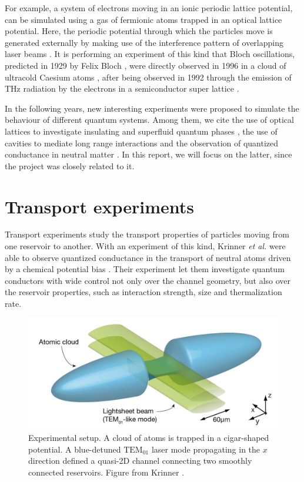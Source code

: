 For example, a system of electrons moving in an ionic periodic lattice potential, can be simulated using a gas of fermionic atoms trapped in an optical lattice potential. Here, the periodic potential
through which the particles move is generated externally by making
use of the interference pattern of overlapping laser beams \cite{bloch2008}. It is performing an experiment of this kind that Bloch oscillations, predicted in 1929 by Felix Bloch \cite{bloch1929a}, were directly observed in 1996 in a cloud of ultracold Caesium atoms \cite{dahan1996}, after being observed in 1992 through the emission of THz radiation by the electrons in a semiconductor super lattice \cite{feldmann1992}.

In the following years, new interesting experiments were proposed to simulate the behaviour of different quantum systems. Among them, we cite the use of optical lattices to investigate insulating and superfluid quantum phases \cite{greiner2002}, the use of cavities to mediate long range interactions \cite{landig2016} and the observation of quantized conductance in neutral matter \cite{krinner2015}. In this report, we will focus on the latter, since the project was closely related to it.

\section{Transport experiments}
Transport experiments study the transport properties of particles moving from one reservoir to another. With an experiment of this kind, Krinner \emph{et al.} were able to observe  quantized conductance in the transport of neutral atoms driven by a chemical potential bias \cite{krinner2015}. Their experiment let them investigate
quantum conductors with wide control not only over the channel
geometry, but also over the reservoir properties, such as interaction strength, size and thermalization rate.

\begin{figure}
    \includegraphics[width=\textwidth]{chapters/chapter_1/figures/reservoir.png}
    \caption{Experimental setup. A cloud of atoms is trapped in a cigar-shaped potential. A blue-detuned $\text{TEM}_{01}$ laser mode propagating in the $x$ direction defined a quasi-2D channel connecting two smoothly connected reservoirs. Figure from Krinner \cite{krinner2015b}.}
    \label{fig:lithium_apparatus}
\end{figure}

